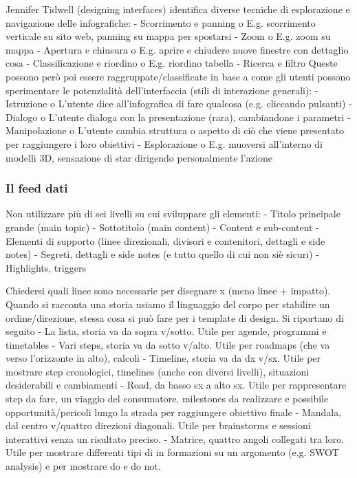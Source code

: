Jennifer Tidwell (designing interfaces) identifica diverse tecniche di esplorazione e navigazione delle infografiche:
-	Scorrimento e panning
o	E.g. scorrimento verticale su sito web, panning su mappa per spostarsi
-	Zoom
o	E.g. zoom su mappa
-	Apertura e chiusura
o	E.g. aprire e chiudere nuove finestre con dettaglio cosa 
-	Classificazione e riordino
o	E.g. riordino tabella
-	Ricerca e filtro
Queste possono però poi essere raggruppate/classificate in base a come gli utenti possono sperimentare le potenzialità dell'interfaccia (stili di interazione generali):
-	Istruzione
o	L'utente dice all'infografica di fare qualcosa (e.g. cliccando pulsanti)
-	Dialogo
o	L'utente dialoga con la presentazione (rara), cambiandone i parametri 
-	Manipolazione
o	L'utente cambia struttura o aspetto di ciò che viene presentato per raggiungere i loro obiettivi 
-	Esplorazione
o	E.g. muoversi all'interno di modelli 3D, sensazione di star dirigendo personalmente l'azione


\subsubsection{Il feed dati}

Non utilizzare più di sei livelli su cui sviluppare gli elementi:
-	Titolo principale grande (main topic)
-	Sottotitolo (main content)
-	Content e sub-content
-	Elementi di supporto (linee direzionali, divisori e contenitori, dettagli e side notes)
-	Segreti, dettagli e side notes (e tutto quello di cui non siè sicuri)
-	Highlights, triggers


Chiedersi quali linee sono necessarie per disegnare x (meno linee + impatto).
Quando si racconta una storia usiamo il linguaggio del corpo per stabilire un ordine/direzione, stessa cosa si può fare per i template di design. Si riportano di seguito
-	La lista, storia va da sopra v/sotto. Utile per agende, programmi e timetables
-	Vari steps, storia va da sotto v/alto. Utile per roadmaps (che va verso l'orizzonte in alto), calcoli
-	Timeline, storia va da dx v/sx. Utile per mostrare step cronologici, timelines (anche con diversi livelli), situazioni desiderabili e cambiamenti
-	Road, da basso sx a alto sx. Utile per rappresentare step da fare, un viaggio del consumatore, milestones da realizzare e possibile opportunità/pericoli lungo la strada per raggiungere obiettivo finale
-	Mandala, dal centro v/quattro direzioni diagonali. Utile per brainstorms e sessioni interattivi senza un risultato preciso.
-	Matrice, quattro angoli collegati tra loro. Utile per mostrare differenti tipi di in formazioni su un argomento (e.g. SWOT analysis) e per mostrare do e do not.


